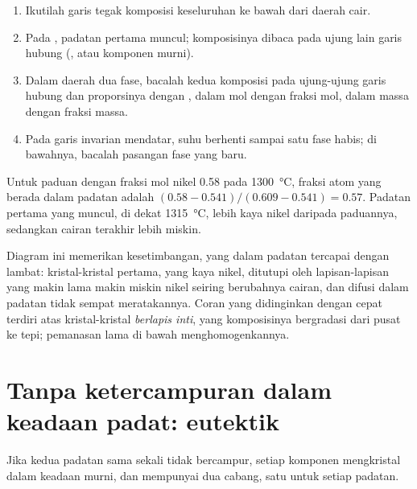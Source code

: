 \begin{method}\label{met:b2:solid-liquid-diagrams:read-solid-liquid}
\begin{enumerate}
  \item Ikutilah garis tegak komposisi keseluruhan ke bawah dari daerah
        cair.
  \item Pada , padatan pertama muncul; komposisinya dibaca pada
        ujung lain garis hubung (, atau komponen murni).
  \item Dalam daerah dua fase, bacalah kedua komposisi pada ujung-ujung
        garis hubung dan proporsinya dengan , dalam mol dengan
        fraksi mol, dalam massa dengan fraksi massa.
  \item Pada garis invarian mendatar, suhu berhenti sampai satu fase
        habis; di bawahnya, bacalah pasangan fase yang baru.
\end{enumerate}
\end{method}

\begin{example}\label{ex:b2:solid-liquid-diagrams:lever}
Untuk paduan dengan fraksi mol nikel 0.58 pada \qty{1300}{\degreeCelsius},
fraksi atom yang berada dalam padatan adalah
$(0.58 - 0.541)/(0.609 - 0.541) = 0.57$. Padatan pertama yang muncul, di
dekat \qty{1315}{\degreeCelsius}, lebih kaya nikel daripada paduannya,
sedangkan cairan terakhir lebih miskin.
\end{example}

Diagram ini memerikan kesetimbangan, yang dalam padatan tercapai dengan
lambat: kristal-kristal pertama, yang kaya nikel, ditutupi oleh
lapisan-lapisan yang makin lama makin miskin nikel seiring berubahnya
cairan, dan difusi dalam padatan tidak sempat meratakannya. Coran yang
didinginkan dengan cepat terdiri atas kristal-kristal \textit{berlapis
inti}, yang komposisinya bergradasi dari pusat ke tepi; pemanasan lama di
bawah  menghomogenkannya.

\section{Tanpa ketercampuran dalam keadaan padat: eutektik}

Jika kedua padatan sama sekali tidak bercampur, setiap komponen
mengkristal dalam keadaan murni, dan  mempunyai dua cabang, satu
untuk setiap padatan.

